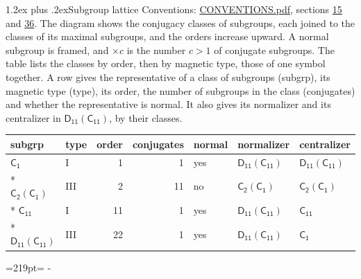 \documentclass[10pt,a4paper]{article}
\makeatletter
\renewcommand\section{\@startsection{section}{1}{\z@}{-3ex plus -1ex minus -.2ex}%
  {1.2ex plus .2ex}{\normalfont\large\sffamily\bfseries\color{parttitle}}}
\newcommand{\needspace}[1]{\par\penalty-100\begingroup\dimen0=#1\relax\dimen2=\pagegoal
  \advance\dimen2-\pagetotal\ifdim\dimen0>\dimen2\relax\ifdim\dimen2>0pt\vfil\break\fi\fi
  \endgroup}
\numberwithin{equation}{section}
\newcommand{\grp}[1]{\mathsf{#1}}
\newcommand{\nconj}[1]{{\scriptsize$\times#1$}}
\makeatother
\begin{document}
\section{Subgroup lattice}\label{s:subgroups}
Conventions: \href{../../CONVENTIONS.pdf}{CONVENTIONS.pdf}, sections \href{../../../rotation/CONVENTIONS.pdf\#conv.15}{15} and \href{../../CONVENTIONS.pdf\#conv.36}{36}.
The diagram shows the conjugacy classes of subgroups, each joined to the classes of its maximal subgroups, and the orders increase upward. \label{n:index.conjugates.c}\label{n:mark.conjugates}A normal subgroup is framed, and ${\times}c$ is the number $c > 1$ of conjugate subgroups. The table lists the classes by order, then by magnetic type, those of one symbol together. \label{n:head.subgroup}\label{n:head.magnetic.type}\label{n:head.order}\label{n:head.conjugates}\label{n:head.normal}A row gives the representative of a class of subgroups (subgrp), its magnetic type (type), its order, the number of subgroups in the class (conjugates) and whether the representative is normal. \label{n:head.normalizer}\label{n:head.centralizer}It also gives its normalizer and its centralizer in $\grp{D_{11}}(\grp{C_{11}})$, by their classes. 
\begin{center}
\end{center}
{\small\begin{longtable}{@{}llrrlll@{}}\toprule
subgrp & type & order & conjugates & normal & normalizer & centralizer\\\midrule\endhead
\bottomrule\endfoot\endlastfoot
\href{../../../rotation/data/pdf/C1.pdf}{$\grp{C_{1}}$} & I & 1 & 1 & yes & \href{D11-C11.pdf}{$\grp{D_{11}}(\grp{C_{11}})$} & \href{D11-C11.pdf}{$\grp{D_{11}}(\grp{C_{11}})$}\\*
\href{C2-C1.pdf}{$\grp{C_{2}}(\grp{C_{1}})$} & III & 2 & 11 & no & \href{C2-C1.pdf}{$\grp{C_{2}}(\grp{C_{1}})$} & \href{C2-C1.pdf}{$\grp{C_{2}}(\grp{C_{1}})$}\\*
\href{../../../rotation/data/pdf/C11.pdf}{$\grp{C_{11}}$} & I & 11 & 1 & yes & \href{D11-C11.pdf}{$\grp{D_{11}}(\grp{C_{11}})$} & \href{../../../rotation/data/pdf/C11.pdf}{$\grp{C_{11}}$}\\*
\href{D11-C11.pdf}{$\grp{D_{11}}(\grp{C_{11}})$} & III & 22 & 1 & yes & \href{D11-C11.pdf}{$\grp{D_{11}}(\grp{C_{11}})$} & \href{../../../rotation/data/pdf/C1.pdf}{$\grp{C_{1}}$}\\
\bottomrule\end{longtable}}
\needspace{219pt}
\end{document}
